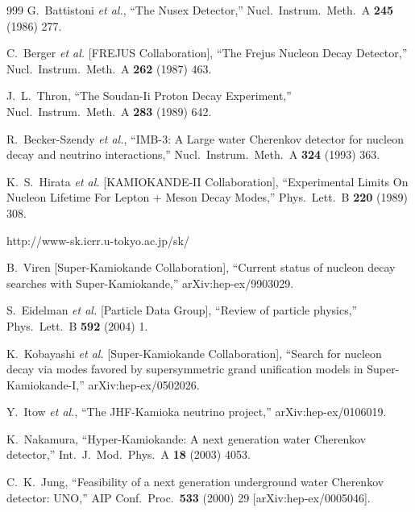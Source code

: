 \begin{thebibliography}{999}
  G.~Battistoni {\it et al.},
  ``The Nusex Detector,''
  Nucl.\ Instrum.\ Meth.\ A {\bf 245} (1986) 277.

  C.~Berger {\it et al.}  [FREJUS Collaboration],
  ``The Frejus Nucleon Decay Detector,''
  Nucl.\ Instrum.\ Meth.\ A {\bf 262} (1987) 463.

  J.~L.~Thron,
  ``The Soudan-Ii Proton Decay Experiment,''
  Nucl.\ Instrum.\ Meth.\ A {\bf 283} (1989) 642.

  R.~Becker-Szendy {\it et al.},
  ``IMB-3: A Large water Cherenkov detector for nucleon decay and neutrino
  interactions,''
  Nucl.\ Instrum.\ Meth.\ A {\bf 324} (1993) 363.

  K.~S.~Hirata {\it et al.}  [KAMIOKANDE-II Collaboration],
  ``Experimental Limits On Nucleon Lifetime For Lepton + Meson Decay Modes,''
  Phys.\ Lett.\ B {\bf 220} (1989) 308.

http://www-sk.icrr.u-tokyo.ac.jp/sk/

  B.~Viren  [Super-Kamiokande Collaboration],
  ``Current status of nucleon decay searches with Super-Kamiokande,''
  arXiv:hep-ex/9903029.

  S.~Eidelman {\it et al.}  [Particle Data Group],
  ``Review of particle physics,''
  Phys.\ Lett.\ B {\bf 592} (2004) 1.

  K.~Kobayashi {\it et al.}  [Super-Kamiokande Collaboration],
  ``Search for nucleon decay via modes favored by supersymmetric grand
  unification models in Super-Kamiokande-I,''
  arXiv:hep-ex/0502026.

  Y.~Itow {\it et al.},
  ``The JHF-Kamioka neutrino project,''
  arXiv:hep-ex/0106019.

  K.~Nakamura,
  ``Hyper-Kamiokande: A next generation water Cherenkov detector,''
  Int.\ J.\ Mod.\ Phys.\ A {\bf 18} (2003) 4053.

  C.~K.~Jung,
  ``Feasibility of a next generation underground water Cherenkov detector:
  UNO,''
  AIP Conf.\ Proc.\  {\bf 533} (2000) 29
  [arXiv:hep-ex/0005046].



\end{thebibliography}
